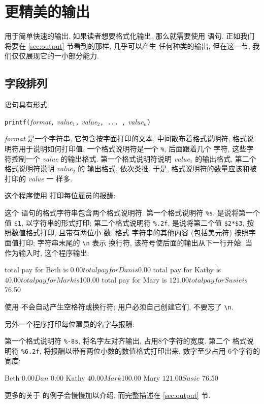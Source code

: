 \section{更精美的输出}
\label{sec:fancier_output}

\print 用于简单快速的输出. 如果读者想要格式化输出, 那么就需要使用 \printf
语句. 正如我们将要在 \ref{sec:output} 节看到的那样, \printf 几乎可以产生
任何种类的输出, 但在这一节, 我们仅仅展现它的一小部分能力.

\subsection{字段排列}
\label{subsec:lining_up_fields}

\printf 语句具有形式
\begin{pattern}
    \texttt{printf(}\textit{format}\texttt{,} \textit{value$_1$}\texttt{,}
    \textit{value$_2$}\texttt{, ... ,} \textit{value$_n$}\texttt{)}
\end{pattern}
\textit{format} 是一个字符串, 它包含按字面打印的文本, 中间散布着格式说明符,
格式说明符用于说明如何打印值. 一个格式说明符是一个 \verb'%', 后面跟着几个
字符, 这些字符控制一个 \textit{value} 的输出格式. 第一个格式说明符说明
\textit{value$_1$} 的输出格式, 第二个格式说明符说明 \textit{value$_2$} 的
输出格式, 依次类推. 于是, 格式说明符的数量应该和被打印的 \textit{value} 一
样多.

这个程序使用 \printf 打印每位雇员的报酬:
这个 \printf 语句的格式字符串包含两个格式说明符. 第一个格式说明符
\verb'%s', 是说将第一个值 \verb'$1', 以字符串的形式打印; 第二个格式说明符
\verb'%.2f', 是说将第二个值 \verb'$2*$3', 按照数值格式打印, 且带有两位小
数. 格式
字符串的其他内容 (包括美元符) 按照字面值打印; 字符串末尾的 \verb'\n' 表示
换行符, 该符号使后面的输出从下一行开始. 当  作为输入时,
这个程序输出:
\begin{awkcode}
    total pay for Beth is $0.00
    total pay for Dan is $0.00
    total pay for Kathy is $40.00
    total pay for Mark is $100.00
    total pay for Mary is $121.00
    total pay for Susie is $76.50
\end{awkcode}
使用 \printf 不会自动产生空格符或换行符; 用户必须自己创建它们, 不要忘了
\verb'\n'.

另外一个程序打印每位雇员的名字与报酬:
第一个格式说明符 \verb'%-8s', 将名字左对齐输出, 占用8个字符的宽度. 第二个
格式说明符 \verb'%6.2f', 将报酬以带有两位小数的数值格式打印出来,
数字至少占用
6个字符的宽度:
\begin{awkcode}
    Beth     $  0.00
    Dan      $  0.00
    Kathy    $ 40.00
    Mark     $100.00
    Mary     $121.00
    Susie    $ 76.50
\end{awkcode}
更多的关于 \printf 的例子会慢慢加以介绍, 而完整描述在
\ref{sec:output} 节.

